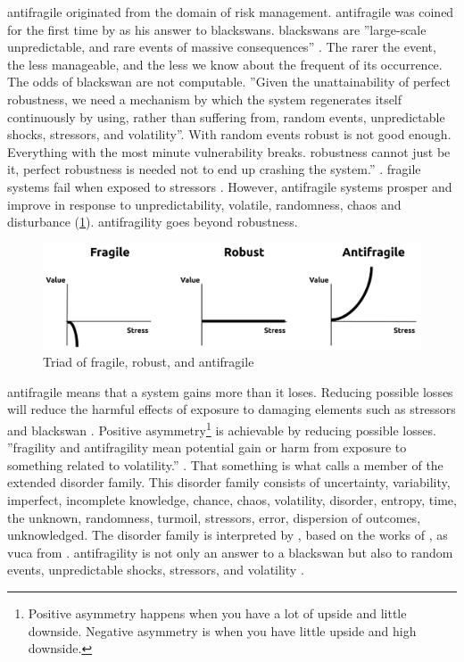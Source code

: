 \Gls{antifragile} originated from the domain of risk management. \Gls{antifragile} was coined for the first time by \textcite{Taleb2012} as his answer to \glspl{blackswan}. \Glspl{blackswan} are ''large-scale unpredictable, and rare events of massive consequences'' \parencite[pp.~6--7]{Taleb2012}. The rarer the event, the less manageable, and the less we know about the frequent of its occurrence. The odds of \gls{blackswan} are not computable. ''Given the unattainability of perfect robustness, we need a mechanism by which the system regenerates itself continuously by using, rather than suffering from, random events, unpredictable shocks, \glspl{stressor}, and \gls{volatility}''. With random events \gls{robust} is not good enough. Everything with the most minute vulnerability breaks. \Gls{robustness} cannot just be it, perfect \gls{robustness} is needed not to end up crashing the system.'' \parencite[p.~8]{Taleb2012}. \Gls{fragile} systems fail when exposed to \glspl{stressor} \parencite[p.~21]{Ghasemi2017}. However, \gls{antifragile} systems prosper and improve in response to unpredictability, \gls{volatile}, randomness, chaos and disturbance (\cref{fig:eaal-triad}). \Gls{antifragility} goes beyond \gls{robustness}.
\begin{figure}[H]
	\centering
	\includegraphics[width=0.8\linewidth]{images/eaal-triad}
	\caption[Triad of fragile, robust, and antifragile \parencite{Botjes2021}]{Triad of fragile, robust, and antifragile \parencite{Botjes2021}}
	\label{fig:eaal-triad}
\end{figure}
\Gls{antifragile} means that a system gains more than it loses. Reducing possible losses will reduce the harmful effects of exposure to damaging elements such as \glspl{stressor} and \gls{blackswan} \parencite[p.~932]{Russo2017}. Positive asymmetry\footnote{Positive asymmetry happens when you have a lot of upside and little downside. Negative asymmetry is when you have little upside and high downside.} is achievable by reducing possible losses. ''\Gls{fragility} and \gls{antifragility} mean potential gain or harm from exposure to something related to \gls{volatility}.'' \parencite[p.~13]{Taleb2012}. That something is what \textcite[p.~13]{Taleb2012} calls a member of the extended disorder family. This disorder family consists of \gls{uncertainty}, variability, imperfect, incomplete knowledge, chance, chaos, \gls{volatility}, disorder, \gls{entropy}, time, the unknown, randomness, turmoil, \glspl{stressor}, error, dispersion of outcomes, unknowledged. The disorder family is interpreted by \textcite[p.~12]{Botjes2020}, based on the works of \textcites[p.~436]{Taleb2012}[p.~3]{Gorgeon2015}, as \acrlong{vuca} from \textcite{Bennis1985}. \Gls{antifragility} is not only an answer to a \gls{blackswan} but also to random events, unpredictable shocks, \glspl{stressor}, and \gls{volatility} \parencite[p.~8]{Taleb2012}.

